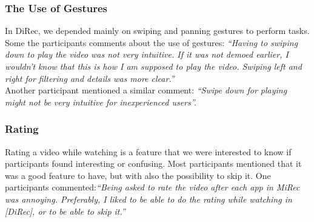\subsubsection{The Use of Gestures}
In DiRec, we depended mainly on swiping and panning gestures to perform tasks.
Some the participants comments about the use of gestures: \textit{``Having to
swiping down to play the video was not very intuitive. If it was not demoed earlier, I wouldn't know that this is how I am supposed to play the
video. Swiping left and right for filtering and details was more clear.''}\\
Another participant mentioned a similar comment: \textit{``Swipe down for
playing might not be very intuitive for inexperienced users''.}
\subsubsection{Rating}
Rating a video while watching is a feature that we were interested to
know if participants found interesting or confusing. Most participants
mentioned that it was a good feature to have, but with also the
possibility to skip it. One participants commented:\textit{``Being asked to rate the video after each app in MiRec was
annoying. Preferably, I liked to be able to do the rating while watching in
[DiRec], or to be able to skip it.''}\\

